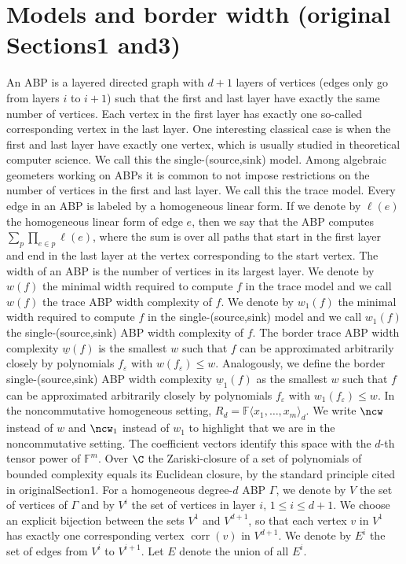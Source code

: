 \section*{Models and border width (original Sections1 and3)}
An ABP is a layered directed graph with $d+1$ layers of vertices (edges only go from layers $i$ to $i+1$) such that the first and last layer have exactly the same number of vertices. Each vertex in the first layer has exactly one so-called corresponding vertex in the last layer. One interesting classical case is when the first and last layer have exactly one vertex, which is usually studied in theoretical computer science. We call this the single-(source,sink) model. Among algebraic geometers working on ABPs it is common to not impose restrictions on the number of vertices in the first and last layer. We call this the trace model. Every edge in an ABP is labeled by a homogeneous linear form. If we denote by $\ell(e)$ the homogeneous linear form of edge $e$, then we say that the ABP computes $\sum_p\prod_{e\in p}\ell(e)$, where the sum is over all paths that start in the first layer and end in the last layer at the vertex corresponding to the start vertex.
The width of an ABP is the number of vertices in its largest layer. We denote by $w(f)$ the minimal width required to compute $f$ in the trace model and we call $w(f)$ the trace ABP width complexity of $f$. We denote by $w_1(f)$ the minimal width required to compute $f$ in the single-(source,sink) model and we call $w_1(f)$ the single-(source,sink) ABP width complexity of $f$.
The border trace ABP width complexity $\underline w(f)$ is the smallest $w$ such that $f$ can be approximated arbitrarily closely by polynomials $f_\varepsilon$ with $w(f_\varepsilon)\le w$. Analogously, we define the border single-(source,sink) ABP width complexity $\underline w_1(f)$ as the smallest $w$ such that $f$ can be approximated arbitrarily closely by polynomials $f_\varepsilon$ with $w_1(f_\varepsilon)\le w$.
In the noncommutative homogeneous setting, $R_d=\mathbb F\langle x_1,\ldots,x_m\rangle_d$. We write $\ncw$ instead of $w$ and $\ncw_1$ instead of $w_1$ to highlight that we are in the noncommutative setting. The coefficient vectors identify this space with the $d$-th tensor power of $\mathbb F^m$. Over $\C$ the Zariski-closure of a set of polynomials of bounded complexity equals its Euclidean closure, by the standard principle cited in originalSection1.
For a homogeneous degree-$d$ ABP $\Gamma$, we denote by $V$ the set of vertices of $\Gamma$ and by $V^i$ the set of vertices in layer $i$, $1\le i\le d+1$. We choose an explicit bijection between the sets $V^1$ and $V^{d+1}$, so that each vertex $v$ in $V^1$ has exactly one corresponding vertex $\operatorname{corr}(v)$ in $V^{d+1}$. We denote by $E^i$ the set of edges from $V^i$ to $V^{i+1}$. Let $E$ denote the union of all $E^i$.
